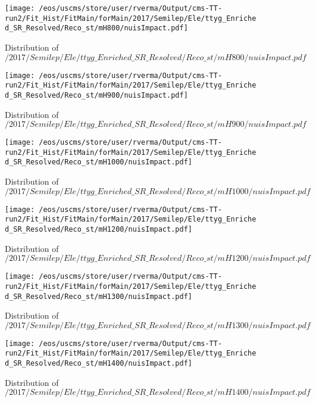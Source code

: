 \begin{figure}
\centering
\texttt{[image: /eos/uscms/store/user/rverma/Output/cms-TT-run2/Fit\_Hist/FitMain/forMain/2017/Semilep/Ele/ttyg\_Enriched\_SR\_Resolved/Reco\_st/mH800/nuisImpact.pdf]}
\caption{Distribution of $/2017/Semilep/Ele/ttyg\_Enriched\_SR\_Resolved/Reco\_st/mH800/nuisImpact.pdf$}
\end{figure}

\begin{figure}
\centering
\texttt{[image: /eos/uscms/store/user/rverma/Output/cms-TT-run2/Fit\_Hist/FitMain/forMain/2017/Semilep/Ele/ttyg\_Enriched\_SR\_Resolved/Reco\_st/mH900/nuisImpact.pdf]}
\caption{Distribution of $/2017/Semilep/Ele/ttyg\_Enriched\_SR\_Resolved/Reco\_st/mH900/nuisImpact.pdf$}
\end{figure}

\begin{figure}
\centering
\texttt{[image: /eos/uscms/store/user/rverma/Output/cms-TT-run2/Fit\_Hist/FitMain/forMain/2017/Semilep/Ele/ttyg\_Enriched\_SR\_Resolved/Reco\_st/mH1000/nuisImpact.pdf]}
\caption{Distribution of $/2017/Semilep/Ele/ttyg\_Enriched\_SR\_Resolved/Reco\_st/mH1000/nuisImpact.pdf$}
\end{figure}

\begin{figure}
\centering
\texttt{[image: /eos/uscms/store/user/rverma/Output/cms-TT-run2/Fit\_Hist/FitMain/forMain/2017/Semilep/Ele/ttyg\_Enriched\_SR\_Resolved/Reco\_st/mH1200/nuisImpact.pdf]}
\caption{Distribution of $/2017/Semilep/Ele/ttyg\_Enriched\_SR\_Resolved/Reco\_st/mH1200/nuisImpact.pdf$}
\end{figure}

\begin{figure}
\centering
\texttt{[image: /eos/uscms/store/user/rverma/Output/cms-TT-run2/Fit\_Hist/FitMain/forMain/2017/Semilep/Ele/ttyg\_Enriched\_SR\_Resolved/Reco\_st/mH1300/nuisImpact.pdf]}
\caption{Distribution of $/2017/Semilep/Ele/ttyg\_Enriched\_SR\_Resolved/Reco\_st/mH1300/nuisImpact.pdf$}
\end{figure}

\begin{figure}
\centering
\texttt{[image: /eos/uscms/store/user/rverma/Output/cms-TT-run2/Fit\_Hist/FitMain/forMain/2017/Semilep/Ele/ttyg\_Enriched\_SR\_Resolved/Reco\_st/mH1400/nuisImpact.pdf]}
\caption{Distribution of $/2017/Semilep/Ele/ttyg\_Enriched\_SR\_Resolved/Reco\_st/mH1400/nuisImpact.pdf$}
\end{figure}

